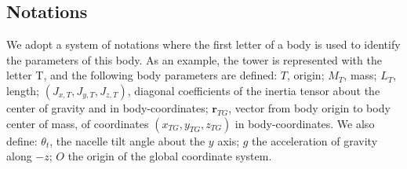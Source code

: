 \documentclass[wes, manuscript]{copernicus}
\renewcommand{\v}[1]{\boldsymbol{#1}}
\begin{document}
\subsection{Notations}
We adopt a system of notations where the first letter of a body is used to identify the parameters of this body.
    As an example, the tower is represented with the letter T, and the following body parameters are defined: $T$, origin; $M_T$, mass; $L_T$, length; $(J_{x,T}, J_{y,T}, J_{z,T})$, diagonal coefficients of the inertia tensor about the center of gravity and in body-coordinates; $\v{r}_{TG}$, vector from body origin to body center of mass, of coordinates $(x_{TG},y_{TG},z_{TG})$ in body-coordinates. 
We also define: $\theta_t$, the nacelle tilt angle about the $y$ axis; $g$ the acceleration of gravity along $-z$; $O$ the origin of the global coordinate system.
\end{document}
